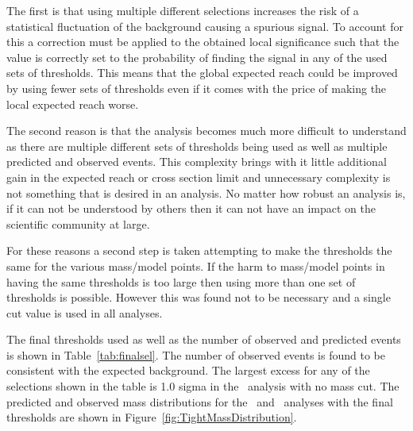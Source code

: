 The first is that using multiple different selections increases the risk of a statistical fluctuation of the background causing a spurious signal. 
To account for this a correction
must be applied to the obtained local significance such that the value is correctly set to the probability of finding the signal in any of the used sets of thresholds. This
means that the global expected reach could be improved by using fewer sets of thresholds even if it comes with the price of making the local expected reach worse.

The second reason is that the analysis becomes much more difficult to understand as there are multiple different sets of thresholds being used as well as multiple predicted and 
observed events. This complexity brings with it little additional gain in the expected reach or cross section limit and unnecessary complexity is not something that
is desired in an analysis. No matter how robust an analysis is, if it can not be 
understood by others then it can not have an impact on the scientific community at large.

For these reasons a second step is taken attempting to make the thresholds the same for the various mass/model points. If the harm to mass/model points in having the
same thresholds is too large then using more than one set of thresholds is possible. 
However this was found not to be necessary and a single cut value is used in all analyses. 

The final thresholds used as well as the number of
observed and predicted events is shown in Table~\ref{tab:finalsel}. 
The number of observed events is found to be consistent with the expected background.
The largest excess for any of the selections shown in the table is 1.0 sigma in the \tkonly\ analysis with no mass cut.
The predicted and observed mass distributions for the \tkonly\ and \tktof\ analyses
with the final thresholds are shown in Figure~\ref{fig:TightMassDistribution}. 

